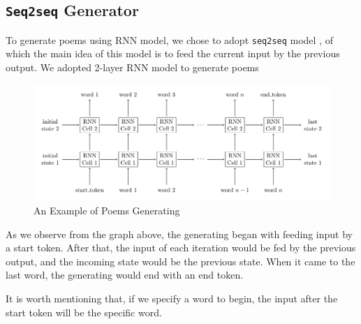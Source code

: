 \documentclass[10pt]{article}
\begin{document}
\subsection{\texttt{Seq2seq} Generator}
To generate poems using RNN model, we chose to adopt \texttt{seq2seq} model \cite{sutskever2014sequence}, of which the main idea of this model is to feed the current input by the previous output. We adopted 2-layer RNN model to generate poems
\begin{figure}[H]
\centering
\includegraphics[scale=.8]{seq2seq.pdf}
\caption{An Example of Poems Generating}
\label{seq2seq}
\end{figure}
As we observe from the graph above, the generating began with feeding input by a start token. After that, the input of each iteration would be fed by the previous output, and the incoming state would be the previous state. When it came to the last word, the generating would end with an end token.\par
It is worth mentioning that, if we specify a word to begin, the input after the start token will be the specific word.
\end{document}

